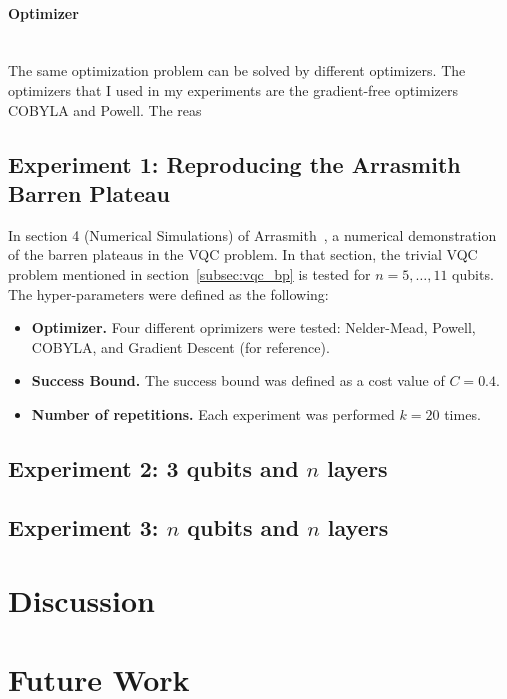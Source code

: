 \documentclass[a4paper,12pt]{article}
\begin{document}
\paragraph*{Optimizer}~\\
The same optimization problem can be solved by different optimizers.
The optimizers that I used in my experiments are the gradient-free optimizers COBYLA and Powell.
The reas


\subsection{Experiment 1: Reproducing the Arrasmith Barren Plateau} \label{subsec:recreate}
In section 4 (Numerical Simulations) of Arrasmith~\cite{arrasmith_effect_2021}, a numerical demonstration of the barren plateaus in the VQC problem.
In that section, the trivial VQC problem mentioned in section~\ref{subsec:vqc_bp} is tested for $n=5,\dots,11$ qubits.
The hyper-parameters were defined as the following:
\begin{itemize}
    \item \textbf{Optimizer.} Four different oprimizers were tested: Nelder-Mead, Powell, COBYLA, and Gradient Descent (for reference).
    \item \textbf{Success Bound.} The success bound was defined as a cost value of $C=0.4$.
    \item \textbf{Number of repetitions.} Each experiment was performed $k=20$ times.
\end{itemize}

\subsection{Experiment 2: 3 qubits and $n$ layers} \label{subsec:3qubits}

\subsection{Experiment 3: $n$ qubits and $n$ layers} \label{subsec:nqubits}

\section{Discussion}

\section{Future Work}

\printbibliography
\end{document}
